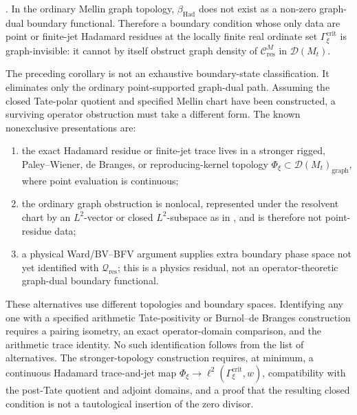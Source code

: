 \begin{corollary}
\label{v4-arith:w9-r4:cor:beta-had-no-go}
\ClaimStatusProvedHere. In the ordinary Mellin graph topology,
\(\beta_{\mathrm{Had}}\) does not exist as a non-zero graph-dual
boundary functional. Therefore a boundary condition whose only data are
point or finite-jet Hadamard residues at the locally finite real
ordinate set \(\Gamma_{\xi}^{\mathrm{crit}}\) is graph-invisible: it
cannot by itself obstruct graph density of
\(\mathcal{C}_{\mathrm{res}}^{M}\) in \(\mathcal{D}(M_t)\).
\end{corollary}

\begin{remark}
\label{v4-arith:w9-r4:rem:beta-had-surviving-branches}
The preceding corollary is not an exhaustive boundary-state
classification. It eliminates only the ordinary point-supported graph-dual path. Assuming
the closed Tate-polar quotient and specified Mellin chart have been
constructed, a surviving operator obstruction must take a different form.
The known nonexclusive presentations are:
\begin{enumerate}
\item the exact Hadamard residue or finite-jet trace lives in a stronger
rigged, Paley--Wiener, de Branges, or reproducing-kernel topology
\(\Phi_{\xi}\subset\mathcal{D}(M_t)_{\mathrm{graph}}\), where point
evaluation is continuous;
\item the ordinary graph obstruction is nonlocal, represented under the
resolvent chart by an \(L^2\)-vector or closed \(L^2\)-subspace as in
, and is therefore
not point-residue data;
\item a physical Ward/BV--BFV argument supplies extra boundary phase
space not yet identified with
\(\mathcal{Q}_{\mathrm{res}}\); this is a physics residual, not an
operator-theoretic graph-dual boundary functional.
\end{enumerate}
These alternatives use different topologies and boundary spaces.
Identifying any one with a specified arithmetic Tate-positivity or
Burnol--de Branges construction requires a pairing isometry, an exact
operator-domain comparison, and the arithmetic trace identity.
No such identification follows from the list of alternatives.
The stronger-topology construction requires, at minimum, a continuous
Hadamard trace-and-jet map
\(\Phi_{\xi}\to\ell^{2}(\Gamma_{\xi}^{\mathrm{crit}},w)\), compatibility
with the post-Tate quotient and adjoint domains, and a proof that the
resulting closed condition is not a tautological insertion of the zero
divisor.
\end{remark}

